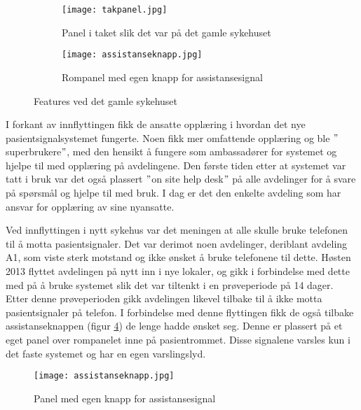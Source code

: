 \begin{figure}[H]
        \centering
        \begin{subfigure}[b]{1.0\textwidth}
        		\centering
                \texttt{[image: takpanel.jpg]}
                \caption{Panel i taket slik det var på det gamle sykehuset}
                \label{takpanel}
        \end{subfigure}
        
        \begin{subfigure}[b]{1.0\textwidth}
        		\centering
                \texttt{[image: assistanseknapp.jpg]}
                \caption{Rompanel med egen knapp for assistansesignal}
                \label{assistanseknapp_gammel}
        \end{subfigure}
        \caption{Features ved det gamle sykehuset}
        \label{takass}
\end{figure}


\noindent
I forkant av innflyttingen fikk de ansatte opplæring i hvordan det nye pasientsignalsystemet fungerte. Noen fikk mer omfattende opplæring og ble $"$superbrukere$"$, med den hensikt å fungere som ambassadører for systemet og hjelpe til med opplæring på avdelingene. Den første tiden etter at systemet var tatt i bruk var det også plassert $"$on site help desk$"$ på alle avdelinger for å svare på spørsmål og hjelpe til med bruk. I dag er det den enkelte avdeling som har ansvar for opplæring av sine nyansatte. 

\noindent
Ved innflyttingen i nytt sykehus var det meningen at alle skulle bruke telefonen til å motta pasientsignaler. Det var derimot noen avdelinger, deriblant avdeling A1, som viste sterk motstand og ikke ønsket å bruke telefonene til dette.
Høsten 2013 flyttet avdelingen på nytt inn i nye lokaler, og gikk i forbindelse med dette med på å bruke systemet slik det var tiltenkt i en prøveperiode på 14 dager. Etter denne prøveperioden gikk avdelingen likevel tilbake til å ikke motta pasientsignaler på telefon. I forbindelse med denne flyttingen fikk de også tilbake assistanseknappen (figur \ref{assistanseknapp_ny}) de lenge hadde ønsket seg. Denne er plassert på et eget panel over rompanelet inne på pasientrommet. Disse signalene varsles kun i det faste systemet og har en egen varslingslyd.

\begin{figure}[H]
\centering
\texttt{[image: assistanseknapp.jpg]}
\caption{Panel med egen knapp for assistansesignal}
\label{assistanseknapp_ny}
\end{figure}


